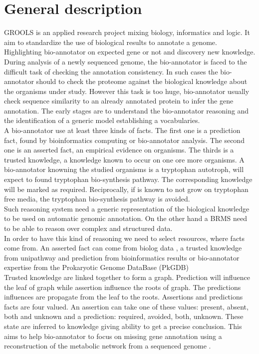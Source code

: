 \documentclass{llncs}
\begin{document}
\section{General description}
GROOLS is an applied research project mixing  biology, informatics and logic. It aim to standardize
the use of biological results to annotate a genome. Highlighting bio-annotator on expected gene or not and discovery new knowledge. During analysis of a newly sequenced genome, the bio-annotator is faced to the difficult task of checking the annotation consistency. In such cases the bio-annotator should to check the proteome against the biological knowledge about the organisms under study. However this task is too huge, bio-annotator usually check sequence similarity to an already annotated protein to infer the gene annotation. The early stages are to understand the bio-annotator reasoning and the identification of a generic model establishing a vocabularies.\\
A bio-annotator use at least three kinds of facts. The first one is a prediction fact, found by bioinformatics computing or bio-annotator analysis. The second one is an asserted fact, an empirical evidence on organisms. The thirds is a trusted knowledge, a knowledge known to occur on one ore more organisms. A bio-annotator knowning the studied organisms is a tryptophan autotroph,  will expect to found tryptophan bio-synthesis pathway. The corresponding knowledge will be marked as required. Reciprocally, if is known to not grow on tryptophan free media, the tryptophan bio-synthesis pathway is avoided. \\
Such reasoning system need a generic representation of the biological knowledge to be used on automatic genomic annotation. On the other hand a BRMS need to be able to reason over complex and structured data. \\
In order to have this kind of reasoning we need to select resources, where facts come from. An asserted fact can come from biolog data \cite{biolog}, a trusted knowledge from unipathway \cite{morgat2011unipathway} and prediction from bioinformatics results or bio-annotator expertise from the Prokaryotic Genome DataBase (PkGDB) \cite{vallenet2012microscope} \\
Trusted knowledge are linked together to form a graph. Prediction will influence the leaf of graph while assertion influence the roots of graph. The predictions influences are propagate from the leaf to the roots. Assertions and predictions facts are four valued. An assertion can take one of these values:  present, absent, both and unknown and a prediction: required, avoided, both, unknown. These state are inferred to knowledge giving ability to get a precise conclusion. This aims to help bio-annotator to focus on missing gene annotation using a reconstruction of the metabolic network from a sequenced genome \cite{francke2005reconstructing}.\\
\end{document}
